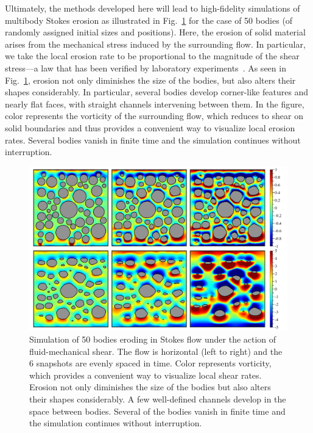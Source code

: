 \documentclass[preprint, 10pt]{elsarticle}
\begin{document}
Ultimately, the methods developed here will lead to high-fidelity simulations of multibody Stokes erosion as illustrated in Fig.~\ref{fig:50bodies} for the case of 50 bodies (of randomly assigned initial sizes and positions). Here, the erosion of solid material arises from the mechanical stress induced by the surrounding flow. In particular, we take the local erosion rate to be proportional to the magnitude of the shear stress---a law that has been verified by laboratory experiments~\cite{ris-moo-chi-she-zha2012}. As seen in Fig.~\ref{fig:50bodies}, erosion not only diminishes the size of the bodies, but also alters their shapes considerably. In particular, several bodies develop corner-like features and nearly flat faces, with straight channels intervening between them. In the figure, color represents the vorticity of the surrounding flow, which reduces to shear on solid boundaries and thus provides a convenient way to visualize local erosion rates. Several bodies vanish in finite time and the simulation continues without interruption.

\begin{figure}%
\begin{center}
\includegraphics[width = 0.80 \textwidth]{./figs/50bod.pdf}
\caption{\label{fig:50bodies} Simulation of 50 bodies eroding in Stokes flow under the action of fluid-mechanical shear. The flow is horizontal (left to right) and the 6 snapshots are evenly spaced in time. Color represents vorticity, which provides a convenient way to visualize local shear rates. Erosion not only diminishes the size of the bodies but also alters their shapes considerably. A few well-defined channels develop in the space between bodies. Several of the bodies vanish in finite time and the simulation continues without interruption.
}
\end{center}
\end{figure}
\end{document}
